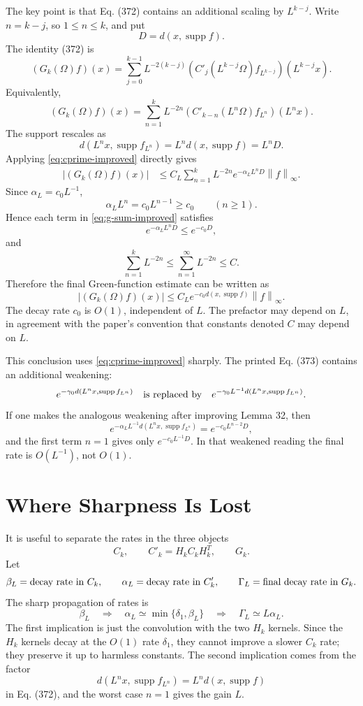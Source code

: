 \documentclass[11pt]{article}
\newcommand{\supp}{\operatorname{supp}}
\newcommand{\norm}[1]{\left\|#1\right\|}
\begin{document}
The key point is that Eq. (372) contains an additional scaling by
\(L^{k-j}\).  Write \(n=k-j\), so \(1\le n\le k\), and put
\[
  D=d(x,\supp f).
\]
The identity (372) is
\begin{equation}
  (G_k(\Omega)f)(x)
  =
  \sum_{j=0}^{k-1}
  L^{-2(k-j)}
  (C'_j(L^{k-j}\Omega)f_{L^{k-j}})(L^{k-j}x).
  \tag{372}
\end{equation}
Equivalently,
\[
  (G_k(\Omega)f)(x)
  =
  \sum_{n=1}^{k}
  L^{-2n}
  (C'_{k-n}(L^n\Omega)f_{L^n})(L^nx).
\]
The support rescales as
\[
  d(L^nx,\supp f_{L^n})=L^n d(x,\supp f)=L^nD.
\]
Applying \eqref{eq:cprime-improved} directly gives
\begin{align}
  |(G_k(\Omega)f)(x)|
  &\le
  C_L
  \sum_{n=1}^{k}
  L^{-2n}e^{-\alpha_LL^nD}\norm{f}_{\infty}.
  \label{eq:g-sum-improved}
\end{align}
Since \(\alpha_L=c_0L^{-1}\),
\[
  \alpha_LL^n=c_0L^{n-1}\ge c_0
  \qquad (n\ge1).
\]
Hence each term in \eqref{eq:g-sum-improved} satisfies
\[
  e^{-\alpha_LL^nD}\le e^{-c_0D},
\]
and
\[
  \sum_{n=1}^{k}L^{-2n}\le \sum_{n=1}^{\infty}L^{-2n}
  \le C.
\]
Therefore the final Green-function estimate can be written as
\begin{equation}
  |(G_k(\Omega)f)(x)|
  \le
  C_L e^{-c_0d(x,\supp f)}\norm{f}_{\infty}.
  \label{eq:g-final-o1}
\end{equation}
The decay rate \(c_0\) is \(O(1)\), independent of \(L\).  The prefactor may
depend on \(L\), in agreement with the paper's convention that constants denoted
\(C\) may depend on \(L\).

This conclusion uses \eqref{eq:cprime-improved} sharply.  The printed Eq. (373)
contains an additional weakening:
\[
  e^{-\gamma_0 d(L^nx,\supp f_{L^n})}
  \quad\hbox{is replaced by}\quad
  e^{-\gamma_0 L^{-1} d(L^nx,\supp f_{L^n})}.
\]
If one makes the analogous weakening after improving Lemma 32, then
\[
  e^{-\alpha_L L^{-1}d(L^nx,\supp f_{L^n})}
  =
  e^{-c_0L^{n-2}D},
\]
and the first term \(n=1\) gives only \(e^{-c_0L^{-1}D}\).  In that weakened
reading the final rate is \(O(L^{-1})\), not \(O(1)\).

\section*{Where Sharpness Is Lost}

It is useful to separate the rates in the three objects
\[
  C_k,\qquad C'_k=H_kC_kH_k^T,\qquad G_k.
\]
Let
\[
  \beta_L=\hbox{decay rate in }C_k,\qquad
  \alpha_L=\hbox{decay rate in }C'_k,\qquad
  \Gamma_L=\hbox{final decay rate in }G_k.
\]
The sharp propagation of rates is
\[
  \beta_L
  \quad\Longrightarrow\quad
  \alpha_L\simeq \min\{\delta_1,\beta_L\}
  \quad\Longrightarrow\quad
  \Gamma_L\simeq L\alpha_L.
\]
The first implication is just the convolution with the two \(H_k\) kernels.  Since
the \(H_k\) kernels decay at the \(O(1)\) rate \(\delta_1\), they cannot improve a
slower \(C_k\) rate; they preserve it up to harmless constants.  The second
implication comes from the factor
\[
  d(L^nx,\supp f_{L^n})=L^n d(x,\supp f)
\]
in Eq. (372), and the worst case \(n=1\) gives the gain \(L\).
\end{document}
